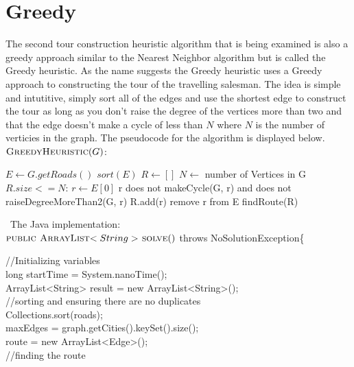 \documentclass[midd]{thesis}
\newcommand{\tab}{\hspace*{2em}}
\begin{document}
\section{Greedy}
\tab The second tour construction heuristic algorithm that is being examined is also a greedy approach similar to the Nearest Neighbor algorithm but is called the Greedy heuristic. As the name suggests the Greedy heuristic uses a Greedy approach to constructing the tour of the travelling salesman. The idea is simple and intutitive, simply sort all of the edges and use the shortest edge to construct the tour as long as you don't raise the degree of the vertices more than two and that the edge doesn't make a cycle of less than $N$ where $N$ is the number of verticies in the graph. The pseudocode for the algorithm is displayed below.\\
$\textnormal{\scshape GreedyHeuristic}(G)$:
\begin{codebox}
\li $E \gets G.getRoads()$
\li $sort(E)$
\li $R \gets []$
\li $N \gets$ number of Vertices in G
\li\While $R.size <= N$:
\li $r \gets E[0]$
\li \If r does not makeCycle(G, r) and does not raiseDegreeMoreThan2(G, r)
\li R.add(r) \End 
\li remove r from E \End
\li\Return findRoute(R)
\end{codebox}\
The Java implementation:\\
$\textnormal{\scshape public ArrayList$<String>$ solve}()$ throws NoSolutionException\{
\begin{codebox}
\tab//Initializing variables\\
\tab long startTime = System.nanoTime();\\	
\tab ArrayList<String> result = new ArrayList<String>();\\
\tab//sorting and ensuring there are no duplicates\\
\tab Collections.sort(roads);\\
\tab maxEdges = graph.getCities().keySet().size();\\
\tab route = new ArrayList<Edge>();\\
\tab//finding the route\\
\end{codebox}
\end{document}
